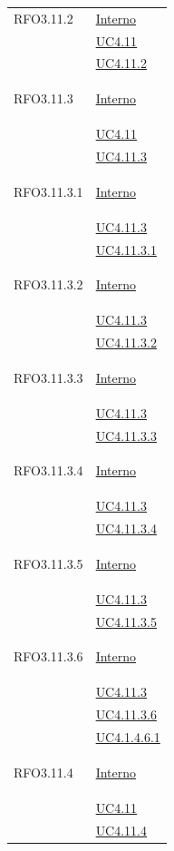 \begin{longtable}{|>{\centering}m{5cm}|m{5cm}<{\centering}|}
\hypertarget{RFO3.11.2}{RFO3.11.2} & \hyperlink{Interno}{Interno}\\
& \hyperref[UC4.11]{UC4.11}\\
& \hyperref[UC4.11.2]{UC4.11.2}\\ \hline

\hypertarget{RFO3.11.3}{RFO3.11.3} & \hyperlink{Interno}{Interno}\\
& \hyperref[UC4.11]{UC4.11}\\
& \hyperref[UC4.11.3]{UC4.11.3}\\ \hline

\hypertarget{RFO3.11.3.1}{RFO3.11.3.1} & \hyperlink{Interno}{Interno}\\
& \hyperref[UC4.11.3]{UC4.11.3}\\
& \hyperref[UC4.11.3.1]{UC4.11.3.1}\\ \hline

\hypertarget{RFO3.11.3.2}{RFO3.11.3.2} & \hyperlink{Interno}{Interno}\\
& \hyperref[UC4.11.3]{UC4.11.3}\\
& \hyperref[UC4.11.3.2]{UC4.11.3.2}\\ \hline

\hypertarget{RFO3.11.3.3}{RFO3.11.3.3} & \hyperlink{Interno}{Interno}\\
& \hyperref[UC4.11.3]{UC4.11.3}\\
& \hyperref[UC4.11.3.3]{UC4.11.3.3}\\ \hline

\hypertarget{RFO3.11.3.4}{RFO3.11.3.4} & \hyperlink{Interno}{Interno}\\
& \hyperref[UC4.11.3]{UC4.11.3}\\
& \hyperref[UC4.11.3.4]{UC4.11.3.4}\\ \hline

\hypertarget{RFO3.11.3.5}{RFO3.11.3.5} & \hyperlink{Interno}{Interno}\\
& \hyperref[UC4.11.3]{UC4.11.3}\\
& \hyperref[UC4.11.3.5]{UC4.11.3.5}\\ \hline

\hypertarget{RFO3.11.3.6}{RFO3.11.3.6} & \hyperlink{Interno}{Interno}\\
& \hyperref[UC4.11.3]{UC4.11.3}\\
& \hyperref[UC4.11.3.6]{UC4.11.3.6}\\
& \hyperref[UC4.1.4.6.1]{UC4.1.4.6.1}\\ \hline

\hypertarget{RFO3.11.4}{RFO3.11.4} & \hyperlink{Interno}{Interno}\\
&\hyperref[UC4.11]{UC4.11}\\
&\hyperref[UC4.11.4]{UC4.11.4}\\ \hline


\end{longtable}
